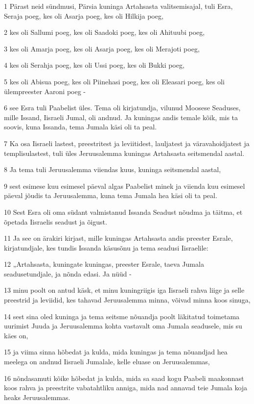 \par 1 Pärast neid sündmusi, Pärsia kuninga Artahsasta valitsemisajal, tuli Esra, Seraja poeg, kes oli Asarja poeg, kes oli Hilkija poeg,
\par 2 kes oli Sallumi poeg, kes oli Saadoki poeg, kes oli Ahituubi poeg,
\par 3 kes oli Amarja poeg, kes oli Asarja poeg, kes oli Merajoti poeg,
\par 4 kes oli Serahja poeg, kes oli Ussi poeg, kes oli Bukki poeg,
\par 5 kes oli Abisua poeg, kes oli Piinehasi poeg, kes oli Eleasari poeg, kes oli ülempreester Aaroni poeg -
\par 6 see Esra tuli Paabelist üles. Tema oli kirjatundja, vilunud Moosese Seaduses, mille Issand, Iisraeli Jumal, oli andnud. Ja kuningas andis temale kõik, mis ta soovis, kuna Issanda, tema Jumala käsi oli ta peal.
\par 7 Ka osa Iisraeli lastest, preestritest ja leviitidest, lauljatest ja väravahoidjatest ja templisulastest, tuli üles Jeruusalemma kuningas Artahsasta seitsmendal aastal.
\par 8 Ja tema tuli Jeruusalemma viiendas kuus, kuninga seitsmendal aastal,
\par 9 sest esimese kuu esimesel päeval algas Paabelist minek ja viienda kuu esimesel päeval jõudis ta Jeruusalemma, kuna tema Jumala hea käsi oli ta peal.
\par 10 Sest Esra oli oma südant valmistanud Issanda Seadust nõudma ja täitma, et õpetada Iisraelis seadust ja õigust.
\par 11 Ja see on ärakiri kirjast, mille kuningas Artahsasta andis preester Esrale, kirjatundjale, kes tundis Issanda käsusõnu ja tema seadusi Iisraelile:
\par 12 „Artahsasta, kuningate kuningas, preester Esrale, taeva Jumala seadusetundjale, ja nõnda edasi. Ja nüüd -
\par 13 minu poolt on antud käsk, et minu kuningriigis iga Iisraeli rahva liige ja selle preestrid ja leviidid, kes tahavad Jeruusalemma minna, võivad minna koos sinuga,
\par 14 sest sina oled kuninga ja tema seitsme nõuandja poolt läkitatud toimetama uurimist Juuda ja Jeruusalemma kohta vastavalt oma Jumala seadusele, mis su käes on,
\par 15 ja viima sinna hõbedat ja kulda, mida kuningas ja tema nõuandjad hea meelega on andnud Iisraeli Jumalale, kelle eluase on Jeruusalemmas,
\par 16 nõndasamuti kõike hõbedat ja kulda, mida sa saad kogu Paabeli maakonnast koos rahva ja preestrite vabatahtliku anniga, mida nad annavad teie Jumala koja heaks Jeruusalemmas.
